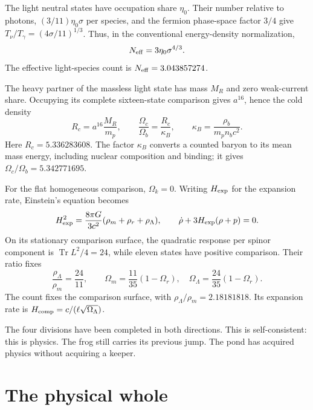 \documentclass[aps,prx,reprint,longbibliography]{revtex4-2}
\providecommand{\Tr}{\operatorname{Tr}}
\begin{document}
The light neutral states have occupation share $\eta_0$. Their number relative to photons, $(3/11)\eta_0\sigma$ per species, and the fermion phase-space factor $3/4$ give $T_\nu/T_\gamma=(4\sigma/11)^{1/3}$. Thus, in the conventional energy-density normalization,
\begin{equation}
 N_{\rm eff}=3\eta_0\sigma^{4/3}.
 \label{eq:Neff}
\end{equation}
The effective light-species count is $N_{\rm eff}=3.043857274$.

The heavy partner of the massless light state has mass $M_R$ and zero weak-current share. Occupying its complete sixteen-state comparison gives $a^{16}$, hence the cold density
\begin{equation}
 R_c=a^{16}\frac{M_R}{m_p},\qquad
 \frac{\Omega_c}{\Omega_b}=\frac{R_c}{\kappa_B},\qquad
 \kappa_B=\frac{\rho_b}{m_pn_bc^2}.
 \label{eq:cold}
\end{equation}
Here $R_c=5.336283608$. The factor $\kappa_B$ converts a counted baryon to its mean mass energy, including nuclear composition and binding; it gives $\Omega_c/\Omega_b=5.342771695$.

For the flat homogeneous comparison, $\Omega_k=0$. Writing $H_{\rm exp}$ for the expansion rate, Einstein's equation becomes
\begin{equation}
 H_{\rm exp}^2=\frac{8\pi G}{3c^2}(\rho_m+\rho_r+\rho_\Lambda),\qquad
 \dot\rho+3H_{\rm exp}(\rho+p)=0.
 \label{eq:friedmann}
\end{equation}
On its stationary comparison surface, the quadratic response per spinor component is $\Tr L^2/4=24$, while eleven states have positive comparison. Their ratio fixes
\begin{equation}
 \frac{\rho_\Lambda}{\rho_m}=\frac{24}{11},\qquad
 \Omega_m=\frac{11}{35}(1-\Omega_r),\quad
 \Omega_\Lambda=\frac{24}{35}(1-\Omega_r).
 \label{eq:epoch}
\end{equation}
The count fixes the comparison surface, with $\rho_\Lambda/\rho_m=2.18181818$. Its expansion rate is $H_{\rm comp}=c/(\ell\sqrt{\Omega_\Lambda})$.

The four divisions have been completed in both directions. This is self-consistent: this is physics. The frog still carries its previous jump. The pond has acquired physics without acquiring a keeper.

\onecolumngrid
\section{The physical whole}
\label{sec:physics}
\end{document}
